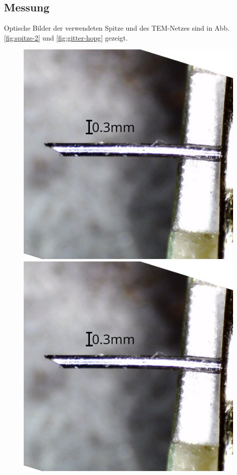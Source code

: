 \documentclass{article}
\begin{document}
\subsection{Messung}
Optische Bilder der verwendeten Spitze und des TEM-Netzes sind in Abb. \ref{fig:spitze-2} und \ref{fig:gitter-hopg} gezeigt.
\begin{figure}[h]
    \centering
    \begin{minipage}{0.49\textwidth}
        \centering
        \includegraphics[width=\textwidth]{Spitze2}
        \includegraphics[width=\textwidth]{Spitze2}

\end{minipage}
\end{figure}
\end{document}
